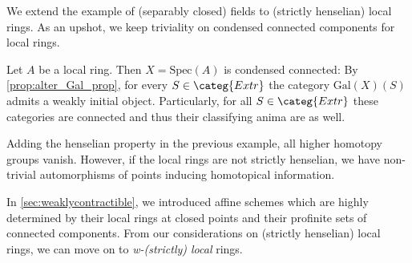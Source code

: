 \documentclass[leqno]{article}
\renewcommand{\Gal}{\mathrm{Gal}}
\newcommand{\Extr}{\categ{Extr}}
\newcommand{\cond}{\mathrm{cond}}
\newcommand{\Picond}{\Pi_{\infty}^{\cond}}
\newcommand{\CondShape}[1]{\Picond(#1)}
\newcommand{\picond}{\uppi^{\cond}}
\newcommand{\pizerocond}{\picond_0}
\renewcommand{\Spec}{\mathrm{Spec}}
\begin{document}
%
We extend the example of (separably closed) fields to (strictly henselian) local rings. As an upshot, we keep triviality on condensed connected components for local rings.
\begin{example}
Let $A$ be a local ring. Then $X=\Spec(A)$ is condensed connected: By \cref{prop:alter_Gal_prop}, for every $S\in \Extr$ the category
$\Gal(X)(S)$ admits a weakly initial object. Particularly, for all $S\in \Extr$ these categories are connected and thus their classifying anima are as well. 
\end{example}
Adding the henselian property in the previous example, all higher homotopy groups vanish. However, if the local rings are not strictly henselian, we have non-trivial automorphisms of points inducing homotopical information. 
%
%
In \cref{sec:weaklycontractible}, we introduced affine schemes which are highly determined by their local rings at closed points and their profinite sets of connected components. From our considerations on (strictly henselian) local rings, we can move on to \textit{w-(strictly) local} rings.
%
%
\end{document}
